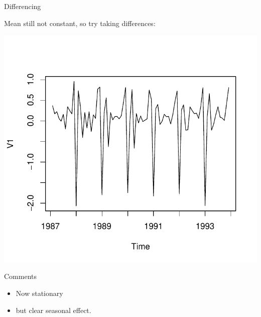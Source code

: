 \begin{frame}[fragile]{Differencing}

  Mean still not constant, so try taking differences:
  
\begin{knitrout}
\color{fgcolor}\begin{kframe}
\begin{alltt}
\hlkwb{=}
\end{alltt}
\end{kframe}
\includegraphics[width=\maxwidth]{figure/sambennedetese-1} 

\end{knitrout}
  
\end{frame}

\begin{frame}{Comments}
  
  \begin{itemize}
\item Now stationary
\item but clear seasonal effect.
  \end{itemize}
\end{frame}

